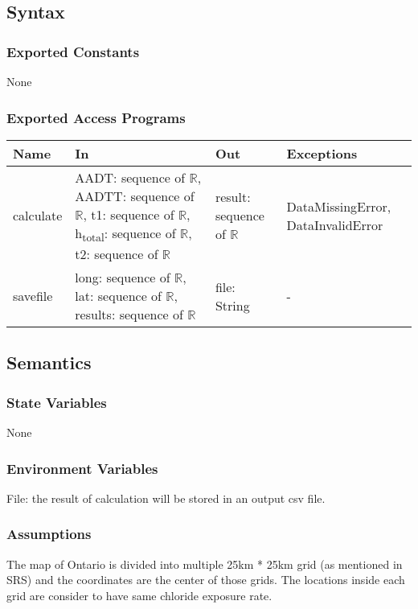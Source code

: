 \documentclass[12pt, titlepage]{article}
\begin{document}
\subsection{Syntax}

\subsubsection{Exported Constants}
None
\subsubsection{Exported Access Programs}

\begin{center}
\begin{tabular}{p{2cm} p{4.5cm} p{4cm} p{4cm}}
\hline
\textbf{Name} & \textbf{In} & \textbf{Out} & \textbf{Exceptions} \\
\hline
calculate & AADT: sequence of $\mathbb{R}$, AADTT: sequence of $\mathbb{R}$, t1: sequence of $\mathbb{R}$, h\textsubscript{total}: sequence of $\mathbb{R}$, t2: sequence of $\mathbb{R}$ & result: sequence of $\mathbb{R}$ & DataMissingError, DataInvalidError \\

savefile & long: sequence of $\mathbb{R}$, lat: sequence of $\mathbb{R}$, results: sequence of $\mathbb{R}$ & file: String & - \\
\hline
\end{tabular}
\end{center}

\subsection{Semantics}


\subsubsection{State Variables}
None
\subsubsection{Environment Variables}
File: the result of calculation will be stored in an output csv file.
\subsubsection{Assumptions}
The map of Ontario is divided into multiple 25km * 25km grid (as mentioned in SRS) and the coordinates are the center of those grids. The locations inside each grid are consider to have same chloride exposure rate.
\end{document}
